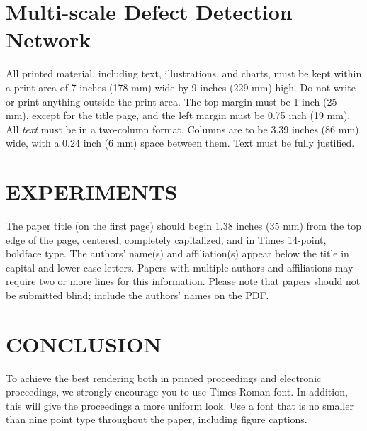 \documentclass{article}
\begin{document}

\section{Multi-scale Defect Detection Network}
\label{sec:format}

All printed material, including text, illustrations, and charts, must be kept
within a print area of 7 inches (178 mm) wide by 9 inches (229 mm) high. Do
not write or print anything outside the print area. The top margin must be 1
inch (25 mm), except for the title page, and the left margin must be 0.75 inch
(19 mm).  All {\it text} must be in a two-column format. Columns are to be 3.39
inches (86 mm) wide, with a 0.24 inch (6 mm) space between them. Text must be
fully justified.

\section{EXPERIMENTS}
\label{sec:pagestyle}

The paper title (on the first page) should begin 1.38 inches (35 mm) from the
top edge of the page, centered, completely capitalized, and in Times 14-point,
boldface type.  The authors' name(s) and affiliation(s) appear below the title
in capital and lower case letters.  Papers with multiple authors and
affiliations may require two or more lines for this information. Please note
that papers should not be submitted blind; include the authors' names on the
PDF.

\section{CONCLUSION}
\label{sec:typestyle}

To achieve the best rendering both in printed proceedings and electronic proceedings, we
strongly encourage you to use Times-Roman font.  In addition, this will give
the proceedings a more uniform look.  Use a font that is no smaller than nine
point type throughout the paper, including figure captions.
\end{document}
